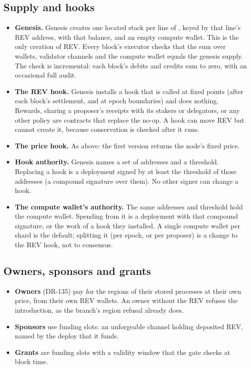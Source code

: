 \documentclass[11pt]{article}
\newcommand{\code}{\path}
\begin{document}
\subsection{Supply and hooks}\label{sec:supply}

\begin{itemize}
\item \textbf{Genesis.} Genesis creates one located stack per line of \code{wallets.txt}, keyed by that line's REV address, with that balance, and an empty compute wallet. This is the only creation of REV. Every block's executor checks that the sum over wallets, validator channels and the compute wallet equals the genesis supply. The check is incremental: each block's debits and credits sum to zero, with an occasional full audit.
\item \textbf{The REV hook.} Genesis installs a hook that is called at fixed points (after each block's settlement, and at epoch boundaries) and does nothing. Rewards, sharing a proposer's receipts with its stakers or delegators, or any other policy are contracts that replace the no-op. A hook can move REV but cannot create it, because conservation is checked after it runs.
\item \textbf{The price hook.} As above: the first version returns the node's fixed price.
\item \textbf{Hook authority.} Genesis names a set of addresses and a threshold. Replacing a hook is a deployment signed by at least the threshold of those addresses (a compound signature over them). No other signer can change a hook.
\item \textbf{The compute wallet's authority.} The same addresses and threshold hold the compute wallet. Spending from it is a deployment with that compound signature, or the work of a hook they installed. A single compute wallet per shard is the default; splitting it (per epoch, or per proposer) is a change to the REV hook, not to consensus.
\end{itemize}

\subsection{Owners, sponsors and grants}

\begin{itemize}
\item \textbf{Owners} (DR-135) pay for the regions of their stored processes at their own price, from their own REV wallets. An owner without the REV refuses the introduction, as the branch's region refusal already does.
\item \textbf{Sponsors} use funding slots: an unforgeable channel holding deposited REV, named by the deploy that it funds.
\item \textbf{Grants} are funding slots with a validity window that the gate checks at block time.
\end{itemize}
\end{document}

